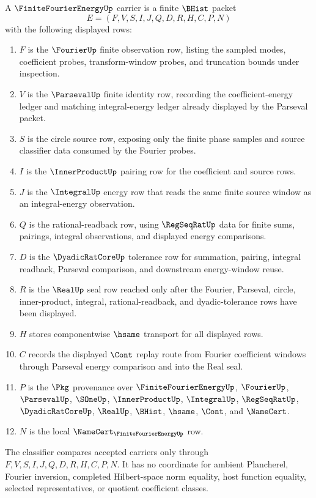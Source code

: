 \begin{definition}
\label{def:finite-fourier-energy-carrier}
A $\FiniteFourierEnergyUp$ carrier is a finite $\BHist$ packet
$$
E=(F,V,S,I,J,Q,D,R,H,C,P,N)
$$
with the following displayed rows:
\begin{enumerate}
\item $F$ is the $\FourierUp$ finite observation row, listing the sampled modes, coefficient probes, transform-window probes, and truncation bounds under inspection.
\item $V$ is the $\ParsevalUp$ finite identity row, recording the coefficient-energy ledger and matching integral-energy ledger already displayed by the Parseval packet.
\item $S$ is the circle source row, exposing only the finite phase samples and source classifier data consumed by the Fourier probes.
\item $I$ is the $\InnerProductUp$ pairing row for the coefficient and source rows.
\item $J$ is the $\IntegralUp$ energy row that reads the same finite source window as an integral-energy observation.
\item $Q$ is the rational-readback row, using $\RegSeqRatUp$ data for finite sums, pairings, integral observations, and displayed energy comparisons.
\item $D$ is the $\DyadicRatCoreUp$ tolerance row for summation, pairing, integral readback, Parseval comparison, and downstream energy-window reuse.
\item $R$ is the $\RealUp$ seal row reached only after the Fourier, Parseval, circle, inner-product, integral, rational-readback, and dyadic-tolerance rows have been displayed.
\item $H$ stores componentwise $\hsame$ transport for all displayed rows.
\item $C$ records the displayed $\Cont$ replay route from Fourier coefficient windows through Parseval energy comparison and into the Real seal.
\item $P$ is the $\Pkg$ provenance over $\FiniteFourierEnergyUp$, $\FourierUp$, $\ParsevalUp$, $\SOneUp$, $\InnerProductUp$, $\IntegralUp$, $\RegSeqRatUp$, $\DyadicRatCoreUp$, $\RealUp$, $\BHist$, $\hsame$, $\Cont$, and $\NameCert$.
\item $N$ is the local $\NameCert_{\FiniteFourierEnergyUp}$ row.
\end{enumerate}
The classifier compares accepted carriers only through $F,V,S,I,J,Q,D,R,H,C,P,N$. It has no coordinate for ambient Plancherel, Fourier inversion, completed Hilbert-space norm equality, host function equality, selected representatives, or quotient coefficient classes.
\end{definition}

